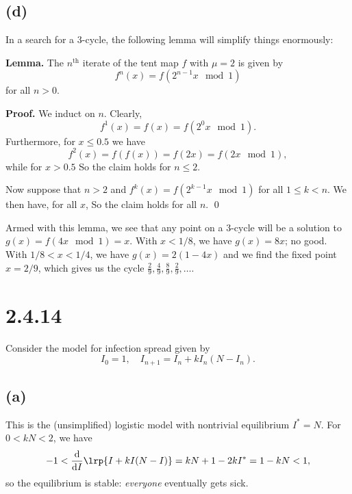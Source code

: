\documentclass{article}
\begin{document}
\subsection*{(d)}
In a search for a 3-cycle, the following lemma will simplify things enormously:

\textbf{Lemma.} The $n^{\text{th}}$ iterate of the tent map $f$ with $\mu=2$ is given by
$$f^n(x)=f(2^{n-1}x \mod1)$$
for all $n>0$.

\textbf{Proof.} We induct on $n$. Clearly,
$$ f^1(x)=f(x)= f(2^0x \mod1).$$
Furthermore, for $x\leq0.5$ we have 
$$f^2(x)=f(f(x))=f(2x)=f(2x\mod1),$$
while for $x>0.5$
So the claim holds for $n\leq2$.

Now suppose that $n>2$ and $f^{k}(x)=f(2^{k-1}x \mod1)$ for all $1\leq k<n$. We then have, for all $x$,
So the claim holds for all $n$. \qed

Armed with this lemma, we see that any point on a 3-cycle will be a solution to $g(x)=f(4x\mod1)=x$. With $x<1/8$, we have $g(x)=8x$; no good. With $1/8<x<1/4$, we have $g(x)=2(1-4x)$ and we find the fixed point $x=2/9$, which gives us the cycle $\frac{2}{9},\frac{4}{9},\frac{8}{9},\frac{2}{9},\ldots$.

 
\section{2.4.14}

Consider the model for infection spread given by
$$I_0=1,\quad I_{n+1}=I_n+kI_n(N-I_n).$$
\subsection*{(a)}
This is the (unsimplified) logistic model with nontrivial equilibrium $I^*=N$. For $0< kN < 2$, we have
$$-1<\frac{\mathrm{d}}{\mathrm{d}I}\lrp{I+kI(N-I)}=kN+1-2kI^*=1-kN<1,$$
so the equilibrium is stable: \emph{everyone} eventually gets sick.
\end{document}
